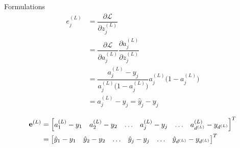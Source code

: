 \documentclass[10pt]{beamer}
\theoremstyle{remark}
\theoremstyle{definition}
\begin{document}
\begin{frame}[allowframebreaks]{Formulations}
	\begin{equation}
		\begin{aligned}
			e_j^{(L)}&=\dfrac{\partial \mathcal{L}}{\partial z_j^{(L)}}\\&=\dfrac{\partial \mathcal{L}}{\partial a_j^{(L)}}\dfrac{\partial a_j^{(L)}}{\partial z_j^{(L)}}\\&=\dfrac{a_j^{(L)}-y_j}{a_j^{(L)}\Big(1-a_j^{(L)}\Big)}a_j^{(L)}\Big(1- a_j^{(L)} \Big)\\&=a_j^{(L)} - y_j =\hat{y}_j - y_j
		\end{aligned}
	\end{equation}

	\begin{equation}
		\begin{aligned}
			\bold{e}^{(L)}&=\begin{bmatrix} a_1^{(L)} - y_1 & a_2^{(L)} - y_2 & \dots & a_j^{(L)} - y_j & \dots & a_{d^{(L)}}^{(L)} - y_{d^{(L)}} \end{bmatrix}^T\\&=\begin{bmatrix} \hat{y}_1 - y_1 & \hat{y}_2 - y_2 & \dots & \hat{y}_j - y_j & \dots & \hat{y}_{d^{(L)}} - y_{d^{(L)}} \end{bmatrix}^T
		\end{aligned}
	\end{equation}

\end{frame}
\end{document}
